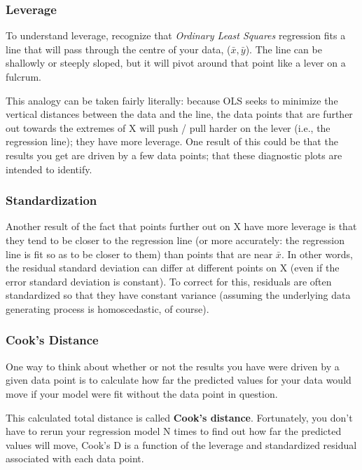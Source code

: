 \documentclass[residuals.tex]{subfiles}
\begin{document}
\subsubsection{Leverage}
To understand leverage, recognize that \textit{Ordinary Least Squares} regression fits a line that will pass through the centre of your data, ($\bar{x}, \bar{y}$). The line can be shallowly or steeply sloped, but it will pivot around that point like a lever on a fulcrum. 

This analogy can be taken fairly literally: because OLS seeks to minimize the vertical distances between the data and the line, the data points that are further out towards the extremes of X will push / pull harder on the lever (i.e., the regression line); they have more leverage. One result of this could be that the results you get are driven by a few data points; that these diagnostic plots are intended to identify.

\subsubsection{Standardization}
Another result of the fact that points further out on X have more leverage is that they tend to be closer to the regression line (or more accurately: the regression line is fit so as to be closer to them) than points that are near $\bar{x}$. In other words, the residual standard deviation can differ at different points on X (even if the error standard deviation is constant). To correct for this, residuals are often standardized so that they have constant variance (assuming the underlying data generating process is homoscedastic, of course).

\subsubsection{Cook's Distance}
One way to think about whether or not the results you have were driven by a given data point is to calculate how far the predicted values for your data would move if your model were fit without the data point in question. 

This calculated total distance is called \textbf{Cook's distance}. Fortunately, you don't have to rerun your regression model N times to find out how far the predicted values will move, Cook's D is a function of the leverage and standardized residual associated with each data point.
\end{document}
